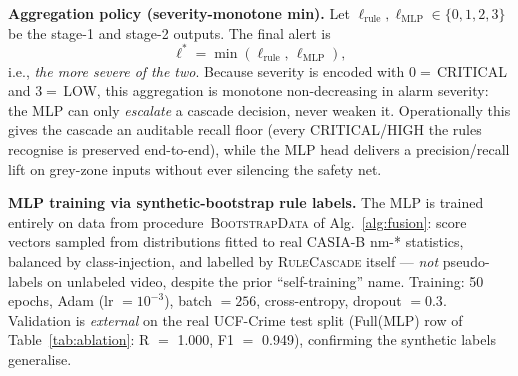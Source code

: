 \documentclass[runningheads]{llncs}
\begin{document}
\textbf{Aggregation policy (severity-monotone min).} Let $\ell_\text{rule}, \ell_\text{MLP} \in \{0,1,2,3\}$ be the stage-1 and stage-2 outputs. The final alert is
\begin{equation}
  \ell^* = \min(\ell_\text{rule},\,\ell_\text{MLP}),
  \label{eq:agg}
\end{equation}
i.e., \emph{the more severe of the two}. Because severity is encoded with $0=$\,CRITICAL and $3=$\,LOW, this aggregation is monotone non-decreasing in alarm severity: the MLP can only \emph{escalate} a cascade decision, never weaken it. Operationally this gives the cascade an auditable recall floor (every CRITICAL/HIGH the rules recognise is preserved end-to-end), while the MLP head delivers a precision/recall lift on grey-zone inputs without ever silencing the safety net.

\textbf{MLP training via synthetic-bootstrap rule labels.} The MLP is trained entirely on data from procedure~\textsc{BootstrapData} of Alg.~\ref{alg:fusion}: score vectors sampled from distributions fitted to real CASIA-B nm-* statistics, balanced by class-injection, and labelled by \textsc{RuleCascade} itself --- \emph{not} pseudo-labels on unlabeled video, despite the prior ``self-training'' name. Training: 50 epochs, Adam (lr $=10^{-3}$), batch $=256$, cross-entropy, dropout $=0.3$. Validation is \emph{external} on the real UCF-Crime test split (Full(MLP) row of Table~\ref{tab:ablation}: R $=$ 1.000, F1 $=$ 0.949), confirming the synthetic labels generalise.
\end{document}
